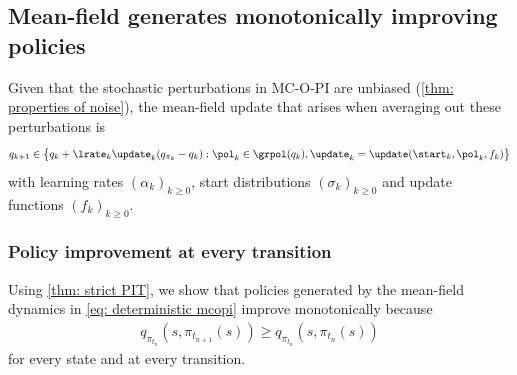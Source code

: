 \subsection{Mean-field generates monotonically improving policies}

Given that the stochastic perturbations in MC-O-PI are unbiased (\autoref{thm: properties of noise}),
the mean-field update that arises when averaging out these perturbations is
\begin{align}
\label{eq: deterministic mcopi}
    q_{k+1}
    \in
    \big\{ q_k + \lrate_k \update_k ( q_{\pi_k} - q_k )
    :
    \pol_k \in \grpol(q_k),
    \update_k = \update(\start_k, \pol_k, f_k)
    \big\}
\end{align}
with learning rates $(\alpha_k)_{k\ge 0}$, start distributions $(\sigma_k)_{k\ge 0}$ and update functions $(f_k)_{k\ge 0}$.

\subsubsection{Policy improvement at every transition}

Using \autoref{thm: strict PIT},
we show that
policies generated by the mean-field dynamics in \eqref{eq: deterministic mcopi} improve monotonically
because
\begin{align}
\label{eq: strict improvement theorem}
q_{\pi_{t_n}}(s,\pi_{t_{n+1}}(s)) \ge q_{\pi_{t_n}}(s,\pi_{t_n}(s))
\end{align}
for every state and at every transition.


